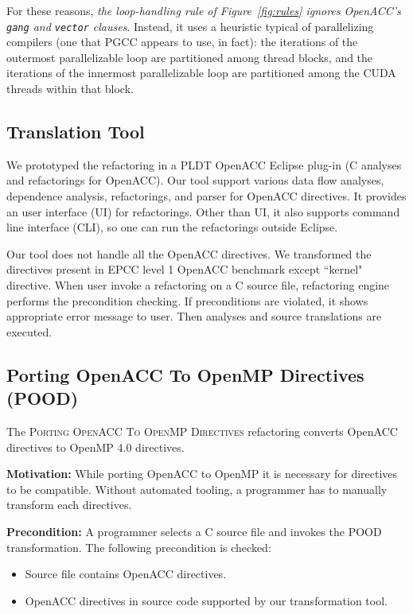 \documentclass{sig-alternate-05-2015}
\newcommand{\pooda}{\textsc{POOD}\xspace}
\newcommand{\pood}{\textsc{Porting OpenACC To OpenMP Directives}\xspace}
\begin{document}
For these reasons, \emph{the loop-handling rule of Figure~\ref{fig:rules}
ignores OpenACC's \texttt{gang} and \texttt{vector} clauses}.  Instead, it uses
a heuristic typical of parallelizing compilers (one that PGCC appears to use,
in fact): the iterations of the outermost parallelizable loop are partitioned
among thread blocks, and the iterations of the innermost parallelizable loop
are partitioned among the CUDA threads within that block.

\subsection{Translation Tool}
We prototyped the refactoring in a PLDT OpenACC Eclipse plug-in (C analyses and refactorings for OpenACC). Our tool support various data flow analyses, dependence analysis, refactorings, and parser for OpenACC directives. It provides an user interface (UI) for refactorings. Other than UI, it also supports command line interface (CLI), so one can run the refactorings outside Eclipse. 

Our tool does not handle all the OpenACC directives. We transformed the directives present in EPCC level 1 OpenACC benchmark except ``kernel" directive. When user invoke a refactoring on a C source file, refactoring engine performs the precondition checking. If preconditions are violated, it shows appropriate error message to user. Then analyses and source translations are executed.
  
\subsection{Porting OpenACC To OpenMP Directives (POOD)}
The \pood refactoring converts OpenACC directives to OpenMP 4.0 directives.

\textbf{Motivation:} While porting OpenACC to OpenMP it is necessary for directives to be compatible. Without automated tooling, a programmer has to manually transform each directives.

\textbf{Precondition:} A programmer selects a C source file and invokes the \pooda transformation. The following precondition is checked:

\begin{itemize}
\item Source file contains OpenACC directives.
\item OpenACC directives in source code supported by our transformation tool.
\end{itemize}  
\end{document}
